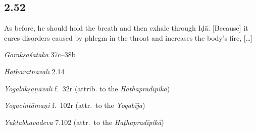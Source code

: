 \begin{ekdosis}
\subsection*{2.52}
\begin{translation}[hp02_052]
As before, he should hold the breath and then exhale through Iḍā. [Because] it cures disorders caused by phlegm in the throat and increases the body’s fire, [\dots]
\end{translation}

\begin{sources}[hp02_052]
\emph{Gorakṣaśataka} 37c–38b
\begin{versinnote}
\end{versinnote}
\end{sources}

\begin{testimonia}[hp02_052]
\emph{Haṭharatnāvalī} 2.14

\begin{versinnote}
\end{versinnote}

\emph{Yogalakṣaṇāvalī} f.~32r (attrib. to the \emph{Haṭhapradīpikā})
\begin{versinnote}
\end{versinnote}

\emph{Yogacintāmaṇi} f.~102r (attr.~to the \emph{Yogabīja})

\begin{versinnote}
\end{versinnote}

\emph{Yuktabhavadeva} 7.102 (attr.~to the \emph{Haṭhapradīpikā})

\begin{versinnote} 
\end{versinnote}


\end{testimonia}
\end{ekdosis}
